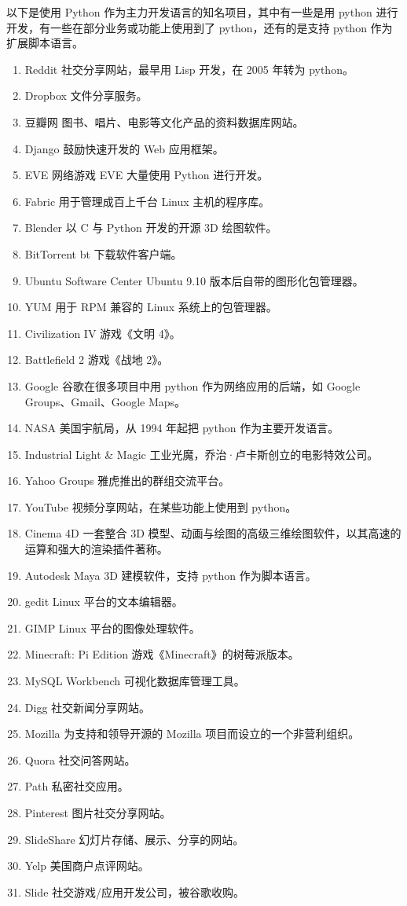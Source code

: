 \documentclass[]{ctexbook}
\providecommand{\tightlist}{%
  \setlength{\itemsep}{0pt}\setlength{\parskip}{0pt}}
\begin{document}
以下是使用 Python 作为主力开发语言的知名项目，其中有一些是用 python 进行开发，有一些在部分业务或功能上使用到了 python，还有的是支持 python 作为扩展脚本语言。

\begin{enumerate}
\def\labelenumi{\arabic{enumi}.}
\tightlist
\item
  Reddit 社交分享网站，最早用 Lisp 开发，在 2005 年转为 python。
\item
  Dropbox 文件分享服务。
\item
  豆瓣网 图书、唱片、电影等文化产品的资料数据库网站。
\item
  Django 鼓励快速开发的 Web 应用框架。
\item
  EVE 网络游戏 EVE 大量使用 Python 进行开发。
\item
  Fabric 用于管理成百上千台 Linux 主机的程序库。
\item
  Blender 以 C 与 Python 开发的开源 3D 绘图软件。
\item
  BitTorrent bt 下载软件客户端。
\item
  Ubuntu Software Center Ubuntu 9.10 版本后自带的图形化包管理器。
\item
  YUM 用于 RPM 兼容的 Linux 系统上的包管理器。
\item
  Civilization IV 游戏《文明 4》。
\item
  Battlefield 2 游戏《战地 2》。
\item
  Google 谷歌在很多项目中用 python 作为网络应用的后端，如 Google Groups、Gmail、Google Maps。
\item
  NASA 美国宇航局，从 1994 年起把 python 作为主要开发语言。
\item
  Industrial Light \& Magic 工业光魔，乔治·卢卡斯创立的电影特效公司。
\item
  Yahoo Groups 雅虎推出的群组交流平台。
\item
  YouTube 视频分享网站，在某些功能上使用到 python。
\item
  Cinema 4D 一套整合 3D 模型、动画与绘图的高级三维绘图软件，以其高速的运算和强大的渲染插件著称。
\item
  Autodesk Maya 3D 建模软件，支持 python 作为脚本语言。
\item
  gedit Linux 平台的文本编辑器。
\item
  GIMP Linux 平台的图像处理软件。
\item
  Minecraft: Pi Edition 游戏《Minecraft》的树莓派版本。
\item
  MySQL Workbench 可视化数据库管理工具。
\item
  Digg 社交新闻分享网站。
\item
  Mozilla 为支持和领导开源的 Mozilla 项目而设立的一个非营利组织。
\item
  Quora 社交问答网站。
\item
  Path 私密社交应用。
\item
  Pinterest 图片社交分享网站。
\item
  SlideShare 幻灯片存储、展示、分享的网站。
\item
  Yelp 美国商户点评网站。
\item
  Slide 社交游戏/应用开发公司，被谷歌收购。
\end{enumerate}
\end{document}

